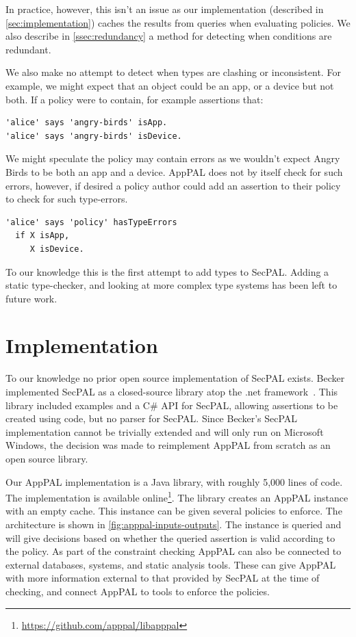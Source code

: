 \documentclass[thesis.tex]{subfiles}
\begin{document}
In practice, however, this isn't an issue as our
implementation (described in \autoref{sec:implementation}) caches the
results from queries when evaluating policies.  We also describe in
\autoref{ssec:redundancy} a method for detecting when conditions are
redundant.

We also make no attempt to detect when types are clashing or
inconsistent.  For example, we might expect that an object could be an
app, or a device but not both.  If a policy were to contain, for
example assertions that:
\begin{lstlisting}
'alice' says 'angry-birds' isApp.
'alice' says 'angry-birds' isDevice.
\end{lstlisting}

We might speculate the policy may contain errors as we wouldn't expect
Angry Birds to be both an app and a device.  AppPAL does not by itself
check for such errors, however, if desired a policy author could add
an assertion to their policy to check for such type-errors.
\begin{lstlisting}
'alice' says 'policy' hasTypeErrors
  if X isApp,
     X isDevice.
\end{lstlisting}

To our knowledge this is the first attempt to add types to SecPAL.  Adding a static type-checker, and looking at more complex type systems has been left to future work.


\section{Implementation}
\label{sec:implementation}

To our knowledge no prior open source implementation of SecPAL exists.  Becker
implemented SecPAL as a closed-source library atop the {.net}
framework~\cite{msr_secpal_research_release_2007}.  This library included
examples and  a C\# API for SecPAL, allowing assertions to be created using
code, but no parser for SecPAL.  Since Becker's SecPAL implementation cannot be
trivially extended and will only run on Microsoft Windows, the decision was
made to reimplement AppPAL from scratch as an open source library.

Our AppPAL implementation is a Java library, with roughly 5,000 lines of code.
The implementation is available
online\footnote{\url{https://github.com/apppal/libapppal}}. The library creates
an AppPAL instance with an empty cache. This instance can be given several policies to enforce. The
architecture is shown in \autoref{fig:apppal-inputs-outputs}. The instance is
queried and will give decisions based on whether the queried assertion is valid
according to the policy. As part of the constraint checking AppPAL can also be
connected to external databases, systems, and static analysis tools. These can
give AppPAL with more information external to that provided by SecPAL at the
time of checking, and connect AppPAL to tools to enforce the policies.
\end{document}
